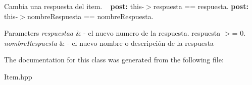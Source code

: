Cambia una respuesta del item. ~\newline
 {\bfseries post\+: } this-\/$>$respuesta == respuesta. {\bfseries post\+: } this-\/$>$nombre\+Respuesta == nombre\+Respuesta. 
\begin{DoxyParams}{Parameters}
{\em respuestaa} & -\/ el nuevo numero de la respuesta. respuesta $>$= 0. \\
\hline
{\em nombre\+Respuesta} & -\/ el nuevo nombre o descripción de la respuesta-\/ \\
\hline
\end{DoxyParams}


The documentation for this class was generated from the following file\+:\begin{DoxyCompactItemize}
\item 
Item.\+hpp\end{DoxyCompactItemize}
